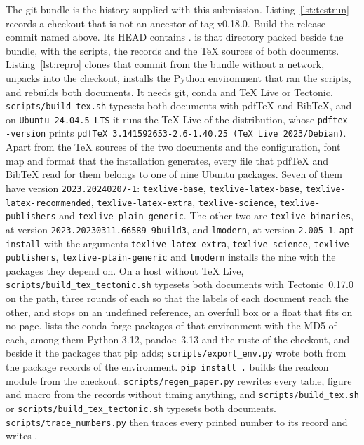 \documentclass[preprint,12pt]{elsarticle}
\begin{document}
The git bundle  is the history supplied with this submission.
Listing~\ref{lst:testrun} records a checkout that is not an ancestor of tag v0.18.0.
Build the release commit named above.
Its HEAD contains .
 is that directory packed beside the bundle, with the scripts, the records and the TeX sources of both documents.
Listing~\ref{lst:repro} clones that commit from the bundle without a network, unpacks  into the checkout, installs the Python environment that ran the scripts, and rebuilds both documents.
It needs git, conda and TeX Live or Tectonic.
\texttt{scripts/\allowbreak build\_tex.sh} typesets both documents with pdfTeX and BibTeX, and on \texttt{Ubuntu 24.04.5 LTS} it runs the TeX Live of the distribution, whose \texttt{pdftex -{}-version} prints \texttt{pdfTeX 3.141592653-2.6-1.40.25 (TeX Live 2023/Debian)}.
Apart from the TeX sources of the two documents and the configuration, font map and format that the installation generates, every file that pdfTeX and BibTeX read for them belongs to one of nine Ubuntu packages.
Seven of them have version \texttt{2023.20240207-1}: \texttt{texlive-\allowbreak base}, \texttt{texlive-\allowbreak latex-\allowbreak base}, \texttt{texlive-\allowbreak latex-\allowbreak recommended}, \texttt{texlive-\allowbreak latex-\allowbreak extra}, \texttt{texlive-\allowbreak science}, \texttt{texlive-\allowbreak publishers} and \texttt{texlive-\allowbreak plain-\allowbreak generic}.
The other two are \texttt{texlive-\allowbreak binaries}, at version \texttt{2023.20230311.66589-9build3}, and \texttt{lmodern}, at version \texttt{2.005-1}.
\texttt{apt install} with the arguments \texttt{texlive-\allowbreak latex-\allowbreak extra}, \texttt{texlive-\allowbreak science}, \texttt{texlive-\allowbreak publishers}, \texttt{texlive-\allowbreak plain-\allowbreak generic} and \texttt{lmodern} installs the nine with the packages they depend on.
On a host without TeX Live, \texttt{scripts/\allowbreak build\_tex\_tectonic.sh} typesets both documents with Tectonic~0.17.0 on the path, three rounds of each so that the labels of each document reach the other, and stops on an undefined reference, an overfull box or a float that fits on no page.
 lists the conda-forge packages of that environment with the MD5 of each, among them Python 3.12, pandoc~3.13 and the rustc of the checkout, and  beside it the packages that pip adds; \texttt{scripts/\allowbreak export\_env.py} wrote both from the package records of the environment.
\texttt{pip install .} builds the readcon module from the checkout.
\texttt{scripts/\allowbreak regen\_paper.py} rewrites every table, figure and macro from the records without timing anything, and \texttt{scripts/\allowbreak build\_tex.sh} or \texttt{scripts/\allowbreak build\_tex\_tectonic.sh} typesets both documents.
\texttt{scripts/\allowbreak trace\_numbers.py} then traces every printed number to its record and writes .
\end{document}
